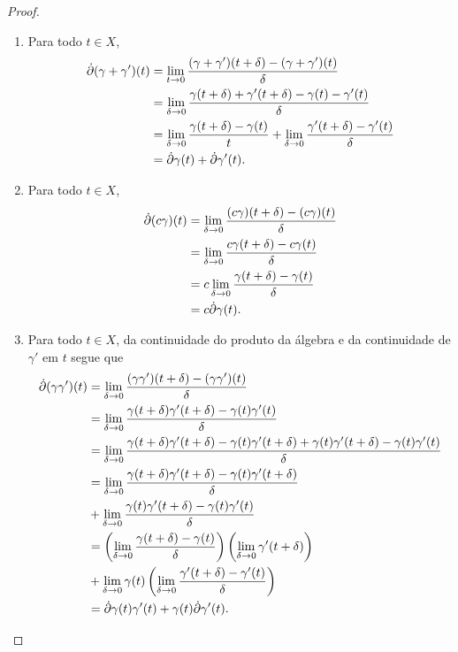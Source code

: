 \begin{proof}
	\begin{enumerate}
	\item Para todo $t \in X$,
		\begin{align*}
		\dot{\partial} (\gamma+\gamma')(t) &= \lim_{t \to 0} \frac{(\gamma+\gamma')(t+\delta)-(\gamma+\gamma')(t)}{\delta} \\
			&= \lim_{\delta \to 0} \frac{\gamma(t+\delta) + \gamma'(t+\delta) - \gamma(t) - \gamma'(t)}{\delta} \\
			&= \lim_{\delta \to 0} \frac{\gamma(t+\delta) - \gamma(t)}{t} + \lim_{\delta \to 0} \frac{\gamma'(t+\delta) - \gamma'(t)}{\delta} \\
			&= \dot{\partial} \gamma(t) + \dot{\partial} \gamma'(t).
		\end{align*}

	\item Para todo $t \in X$,
		\begin{align*}
		\dot{\partial} (c \gamma)(t) &= \lim_{\delta \to 0} \frac{(c \gamma)(t+\delta)-(c \gamma)(t)}{\delta} \\
			&= \lim_{\delta \to 0} \frac{c \gamma(t+\delta) - c \gamma(t)}{\delta} \\
			&= c\lim_{\delta \to 0} \frac{\gamma(t+\delta) - \gamma(t)}{\delta} \\
			&= c\dot{\partial} \gamma(t).
		\end{align*}

	\item Para todo $t \in X$, da continuidade do produto da álgebra e da continuidade de $\gamma'$ em $t$ segue que
		\begin{align*}
		\dot{\partial} (\gamma \gamma')(t) &= \lim_{\delta \to 0} \frac{(\gamma \gamma')(t+\delta) - (\gamma \gamma')(t)}{\delta} \\
			&= \lim_{\delta \to 0} \frac{\gamma(t+\delta)\gamma'(t+\delta) - \gamma(t)\gamma'(t)}{\delta} \\
			&= \lim_{\delta \to 0} \frac{\gamma(t+\delta)\gamma'(t+\delta) - \gamma(t)\gamma'(t+\delta) + \gamma(t)\gamma'(t+\delta) - \gamma(t)\gamma'(t)}{\delta} \\
			&= \lim_{\delta \to 0} \frac{\gamma(t+\delta)\gamma'(t+\delta) - \gamma(t)\gamma'(t+\delta)}{\delta} \\
			&+ \lim_{\delta \to 0} \frac{\gamma(t)\gamma'(t+\delta) - \gamma(t)\gamma'(t)}{\delta} \\
			&= \left( \lim_{\delta \to 0} \frac{\gamma(t+\delta) - \gamma(t)}{\delta} \right) \left( \lim_{\delta \to 0} \gamma'(t+\delta) \right) \\
			&+ \lim_{\delta \to 0} \gamma(t) \left( \lim_{\delta \to 0} \frac{\gamma'(t+\delta) - \gamma'(t)}{\delta} \right) \\
			&= \dot{\partial} \gamma(t) \gamma'(t) + \gamma(t) \dot{\partial} \gamma'(t).
		\qedhere
		\end{align*}
	\end{enumerate}
\end{proof}

